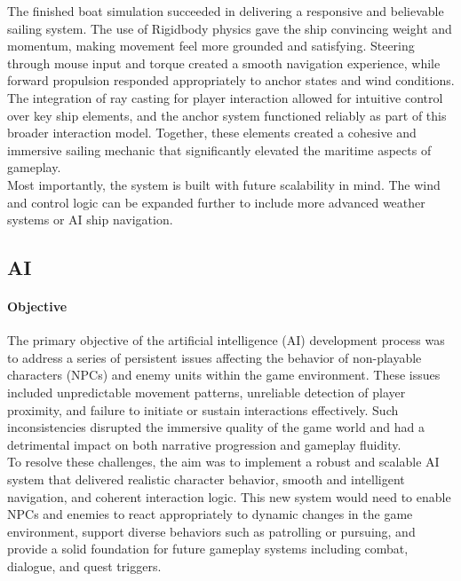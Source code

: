 \documentclass{article}
\begin{document}
The finished boat simulation succeeded in delivering a responsive and believable sailing system. The use of Rigidbody physics gave the ship convincing weight and momentum, making movement feel more grounded and satisfying. Steering through mouse input and torque created a smooth navigation experience, while forward propulsion responded appropriately to anchor states and wind conditions.\\

The integration of ray casting for player interaction allowed for intuitive control over key ship elements, and the anchor system functioned reliably as part of this broader interaction model. Together, these elements created a cohesive and immersive sailing mechanic that significantly elevated the maritime aspects of gameplay.\\

Most importantly, the system is built with future scalability in mind. The wind and control logic can be expanded further to include more advanced weather systems or AI ship navigation.










\newpage
\subsection{AI}
\paragraph{Objective}\hfill

The primary objective of the artificial intelligence (AI) development process was to address a series of persistent issues affecting the behavior of non-playable characters (NPCs) and enemy units within the game environment. These issues included unpredictable movement patterns, unreliable detection of player proximity, and failure to initiate or sustain interactions effectively. Such inconsistencies disrupted the immersive quality of the game world and had a detrimental impact on both narrative progression and gameplay fluidity.\\

To resolve these challenges, the aim was to implement a robust and scalable AI system that delivered realistic character behavior, smooth and intelligent navigation, and coherent interaction logic. This new system would need to enable NPCs and enemies to react appropriately to dynamic changes in the game environment, support diverse behaviors such as patrolling or pursuing, and provide a solid foundation for future gameplay systems including combat, dialogue, and quest triggers.\\
\end{document}
